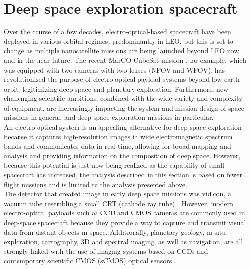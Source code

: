 \documentclass[final,5p,times,sort&compress,twocolumn]{elsarticle}
\begin{document}
\section{Deep space exploration spacecraft}
\label{Section 5}
Over the course of a few decades, electro-optical-based spacecraft have been deployed in various orbital regimes, predominantly in LEO, but this is set to change as multiple nanosatellite missions are being launched beyond LEO now and in the near future. The recent MarCO CubeSat mission \cite{schoolcraft2017marco}, for example, which was equipped with two cameras with two lenses (NFOV and WFOV), has revolutionized the purpose of electro-optical payload systems beyond low earth orbit, legitimizing deep space and planetary exploration.   Furthermore, new challenging scientific ambitions, combined with the wide variety and complexity of equipment, are increasingly impacting the system and mission design of space missions in general, and deep space exploration missions in particular. \\
An electro-optical system is an appealing alternative for deep space exploration because it captures high-resolution images in wide electromagnetic spectrum bands and communicates data in real time, allowing for broad mapping and analysis and providing information on the composition of deep space. However, because this potential is just now being realized as the capability of small spacecraft has increased, the analysis described in this section is based on fewer flight missions and is limited to the analysis presented above.\\
The detector that created image in early deep space missions was vidicon, a vacuum tube resembling a small CRT (cathode ray tube) \cite{nas2023}. However, modern electro-optical payloads such as CCD and CMOS cameras are commonly used in deep-space spacecraft because they provide a way to capture and transmit visual data from distant objects in space. Additionally, planetary geology, in-situ exploration, cartography, 3D and spectral imaging, as well as navigation, are all strongly linked with the use of imaging systems based on CCDs and contemporary scientific CMOS (sCMOS) optical sensors \cite{Behnke2015IMAGINGSF}.
\end{document}

